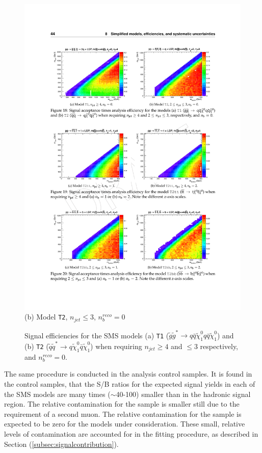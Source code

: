 \begin{figure}[ht]
\begin{minipage}[b]{0.45\linewidth}
\includegraphics[width = 1.0\linewidth]{plots/t2_signal_eff.pdf}
\centering(b)  Model \texttt{T2}, $n_{jet} \leq 3$, $n_{b}^{reco} = 0$ 
\end{minipage}
\caption[Signal efficiencies fo the \ac{SMS} models (a) \texttt{T1} and (b) \texttt{T2}.]{Signal efficiencies for the \ac{SMS} models (a) \texttt{T1} ($\widetilde{g}\widetilde{g}^{*}\rightarrow q\bar{q}\widetilde{\chi}^{0}_{1}q\bar{q}\widetilde{\chi}^{0}_{1}$) and (b) \texttt{T2} ($ \widetilde{q}\widetilde{q}^{*} \rightarrow q\widetilde{\chi}^{0}_{1}\bar{q}\widetilde{\chi}^{0}_{1}$) when requiring $n_{jet} \geq 4$ and $\leq 3$ respectively, and $n_{b}^{reco} = 0$.}
\label{fig:smsefficiencyplots}
\end{figure}


The same procedure is conducted in the analysis control samples. It is found in the \mupjets control samples, that the S/B ratios for the expected signal yields in each of the \ac{SMS} models are many times ($\sim$40-100) smaller than in the hadronic signal region. The relative contamination for the \dimupjets sample is smaller still due to the requirement of a second muon. The relative contamination for the \gpjets sample is expected to be zero for the models under consideration. These small, relative levels of contamination are accounted for in the fitting procedure, as described in Section (\ref{subsec:signalcontribution}).



